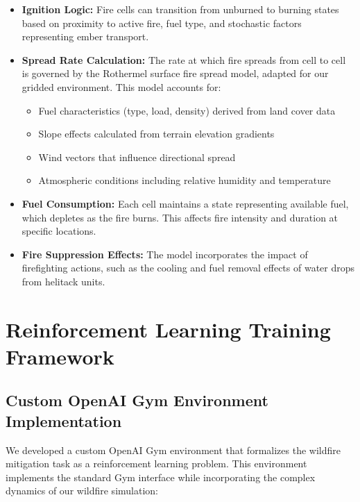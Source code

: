 \documentclass[conference]{IEEEtran}
\begin{document}
\begin{itemize}
    \item \textbf{Ignition Logic:} Fire cells can transition from unburned to burning states based on proximity to active fire, fuel type, and stochastic factors representing ember transport.
    
    \item \textbf{Spread Rate Calculation:} The rate at which fire spreads from cell to cell is governed by the Rothermel surface fire spread model, adapted for our gridded environment. This model accounts for:
    \begin{itemize}
        \item Fuel characteristics (type, load, density) derived from land cover data
        \item Slope effects calculated from terrain elevation gradients
        \item Wind vectors that influence directional spread
        \item Atmospheric conditions including relative humidity and temperature
    \end{itemize}
    
    \item \textbf{Fuel Consumption:} Each cell maintains a state representing available fuel, which depletes as the fire burns. This affects fire intensity and duration at specific locations.
    
    \item \textbf{Fire Suppression Effects:} The model incorporates the impact of firefighting actions, such as the cooling and fuel removal effects of water drops from helitack units.
\end{itemize}

\section{Reinforcement Learning Training Framework}

\subsection{Custom OpenAI Gym Environment Implementation}

We developed a custom OpenAI Gym environment that formalizes the wildfire mitigation task as a reinforcement learning problem. This environment implements the standard Gym interface while incorporating the complex dynamics of our wildfire simulation:
\end{document}
